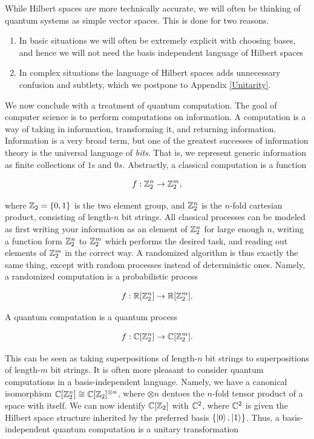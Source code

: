 \documentclass{article}
\theoremstyle{definition}
\numberwithin{figure}{section}
\begin{document}
While Hilbert spaces are more technically accurate, we will often be thinking of quantum systems as simple vector spaces. This is done for two reasons.

\begin{enumerate}
\item In basic situations we will often be extremely explicit with choosing bases, and hence we will not need the basis independent language of Hilbert spaces

\item In complex situations the language of Hilbert spaces adds unnecessary confusion and subtlety, which we postpone to Appendix \ref{Unitarity}.
\end{enumerate}

We now conclude with a treatment of quantum computation. The goal of computer science is to perform computations on information. A computation is a way of taking in information, transforming it, and returning information. Information is a very broad term, but one of the greatest successes of information theory is the universal language of \textit{bits}. That is, we represent generic information as finite collections of $1$s and $0s$. Abstractly, a classical computation is a function

$$f:\mathbb{Z}_2^{n}\to \mathbb{Z}_2^m,$$

where $\mathbb{Z}_2=\{0,1\}$ is the two element group, and $\mathbb{Z}_2^n$ is the $n$-fold cartesian product, consisting of length-$n$ bit strings. All classical processes can be modeled as first writing your information as an element of $\mathbb{Z}_2^n$ for large enough $n$, writing a function form $\mathbb{Z}_2^n$ to $\mathbb{Z}_2^m$ which performs the desired task, and reading out elements of $\mathbb{Z}_2^m$ in the correct way. A randomized algorithm is thus exactly the same thing, except with random processes instead of deterministic ones. Namely, a randomized computation is a probabilistic process

$$f:\mathbb{R}[\mathbb{Z}_2^n]\to \mathbb{R}[\mathbb{Z}_2^m].$$

A quantum computation is a quantum process

$$f:\mathbb{C}[\mathbb{Z}_2^n]\to \mathbb{C}[\mathbb{Z}_2^m].$$

This can be seen as taking superpositions of length-$n$ bit strings to superpositions of length-$m$ bit strings. It is often more pleasant to consider quantum computations in a basis-independent language. Namely, we have a canonical isomorphism $\mathbb{C}[\mathbb{Z}_2^n]\cong \mathbb{C}[\mathbb{Z}_2]^{\otimes n}$, where $\otimes n$ dentoes the $n$-fold tensor product of a space with itself. We can now identify $\mathbb{C}[\mathbb{Z}_2]$ with $\mathbb{C}^2$, where $\mathbb{C}^2$ is given the Hilbert space structure inherited by the preferred basis $\{\left|0\right>,\left|1\right>\}$. Thus, a basis-independent quantum computation is a unitary transformation
\end{document}
